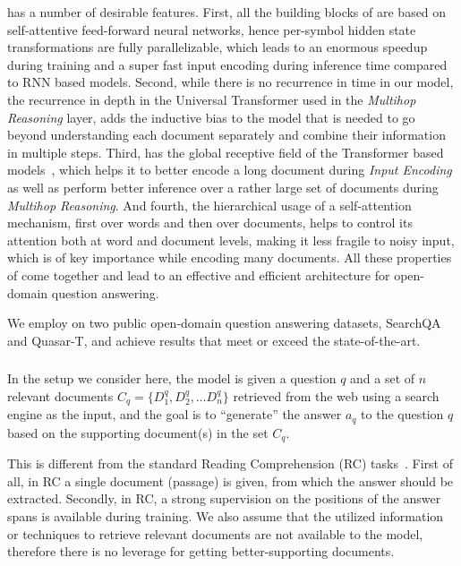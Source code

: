 \tracrnet has a number of desirable features.
%
First, all the building blocks of \tracrnet are based on self-attentive feed-forward neural networks, hence per-symbol hidden state transformations are fully parallelizable, which leads to an enormous speedup during training and a super fast input encoding during inference time compared to RNN based models. 
Second, while there is no recurrence in time in our model, the recurrence in depth in the Universal Transformer used in the \emph{Multihop Reasoning} layer, adds the inductive bias to the model that is needed to go beyond understanding each document separately and combine their information in multiple steps.
Third, \tracrnet has the global receptive field of the Transformer based models~\citep{vaswani2017attention,Dehghani:ICLR:2019}, which helps it to better encode a long document during \emph{Input Encoding} as well as perform better inference over a rather large set of documents during \emph{Multihop Reasoning}.
And fourth, the hierarchical usage of a self-attention mechanism, first over words and then over documents, helps \tracrnet to control its attention both at word and document levels, making it less fragile to noisy input, which is of key importance while encoding many documents.
%
All these properties of \tracrnet come together and lead to an effective and efficient architecture for open-domain question answering. 

We employ \tracrnet on two public open-domain question answering datasets, SearchQA and Quasar-T, and achieve results that meet or exceed the state-of-the-art. 

\subsubsection{\tracrnet} %
\label{sec:tra}
In the setup we consider here, the model is given a question $q$ and a set of $n$ relevant documents $C_q=\{D^q_1, D^q_2, \ldots D^q_n\}$ retrieved from the web using a search engine as the input, and the goal is to ``generate'' the answer $a_q$ to the question $q$ based on the supporting document(s) in the set $C_q$.

This is different from the standard Reading Comprehension (RC) tasks~\cite{hermann2015teaching,xiong2016dynamic}. 
First of all, in RC a single document (passage) is given, from which the answer should be extracted. 
Secondly, in RC, a strong supervision on the positions of the answer spans is available during training.
We also assume that the utilized information or techniques to retrieve relevant documents are not available to the model, therefore there is no leverage for getting better-supporting documents.

